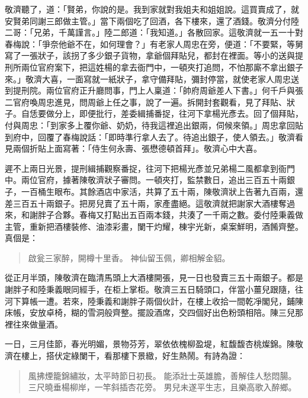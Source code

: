 敬濟聽了，道：「賢弟，你說的是。我到家就對我姐夫和姐姐說。這買賣成了，就安賢弟同謝三郎做主管。」當下兩個吃了回酒，各下樓來，還了酒錢。敬濟分付陸二哥：「兄弟，千萬謹言。」陸二郎道：「我知道。」各散回家。這敬濟就一五一十對春梅說：「爭奈他爺不在，如何理會？」有老家人周忠在旁，便道：「不要緊，等舅寫了一張狀子，該拐了多少銀子貨物，拿爺個拜貼兒，都封在裡面。等小的送與提刑所兩位官府案下，把這姓楊的拿去衙門中，一頓夾打追問，不怕那廝不拿出銀子來。」敬濟大喜，一面寫就一紙狀子，拿守備拜貼，彌封停當，就使老家人周忠送到提刑院。兩位官府正升廳問事，門上人稟道：「帥府周爺差人下書。」何千戶與張二官府喚周忠進見，問周爺上任之事，說了一遍。拆開封套觀看，見了拜貼、狀子。自恁要做分上，即便批行，差委緝捕番捉，往河下拿楊光彥去。回了個拜貼，付與周忠：「到家多上覆你爺、奶奶，待我這裡追出銀兩，伺候來領。」周忠拿回貼到府中，回覆了春梅說話：「即時準行拿人去了。待追出銀子，使人領去。」敬濟看見兩個折貼上面寫著：「侍生何永壽、張懋德頓首拜」。敬濟心中大喜。

遲不上兩日光景，提刑緝捕觀察番捉，往河下把楊光彥並兄弟楊二風都拿到衙門中。兩位官府，據著陳敬濟狀子審問。一頓夾打，監禁數日，追出三百五十兩銀子，一百桶生眼布。其餘酒店中家活，共算了五十兩，陳敬濟狀上告著九百兩，還差三百五十兩銀子。把房兒賣了五十兩，家產盡絕。這敬濟就把謝家大酒樓奪過來，和謝胖子合夥。春梅又打點出五百兩本錢，共湊了一千兩之數。委付陸秉義做主管，重新把酒樓裝修、油漆彩畫，闌干灼耀，棟宇光新，桌案鮮明，酒餚齊整。真個是：
\begin{quote}
啟瓮三家醉，開樽十里香。
神仙留玉佩，卿相解金貂。
\end{quote}

從正月半頭，陳敬濟在臨清馬頭上大酒樓開張，見一日也發賣三五十兩銀子。都是謝胖子和陸秉義眼同經手，在柜上掌柜。敬濟三五日騎頭口，伴當小薑兒跟隨，往河下算帳一遭。若來，陸秉義和謝胖子兩個伙計，在樓上收拾一間乾凈閣兒，鋪陳床帳，安放卓椅，糊的雪洞般齊整。擺設酒席，交四個好出色粉頭相陪。陳三兒那裡往來做量酒。

一日，三月佳節，春光明媚，景物芬芳，翠依依槐柳盈堤，紅馥馥杏桃燦錦。陳敬濟在樓上，搭伏定綠闌干，看那樓下景緻，好生熱鬧。有詩為證：
\begin{quote}
風拂煙籠錦繡妝，太平時節日初長。
能添壯士英雄膽，善解佳人愁悶腸。
三尺曉垂楊柳岸，一竿斜插杏花旁。
男兒未遂平生志，且樂高歌入醉鄉。
\end{quote}

